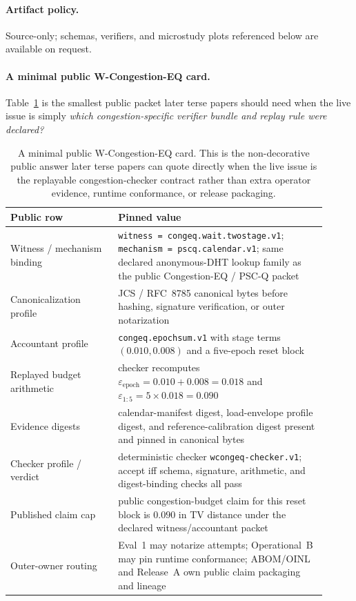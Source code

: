 \documentclass[11pt]{article}
\newcommand{\eps}{\varepsilon}
\begin{document}
\paragraph{Artifact policy.}
Source-only; schemas, verifiers, and microstudy plots referenced below are available on request.\cite{series:artifactpolicy}

\paragraph{A minimal public W-Congestion-EQ card.}
Table~\ref{tab:minimal-wcongeq-card} is the smallest public packet later terse papers should need when the live issue is simply \emph{which congestion-specific verifier bundle and replay rule were declared?}

\begin{table}[t]
\centering
\small
\begin{tabular}{@{}p{0.31\linewidth}p{0.60\linewidth}@{}}
\toprule
\textbf{Public row} & \textbf{Pinned value}\\
\midrule
Witness / mechanism binding & \texttt{witness = congeq.wait.twostage.v1}; \texttt{mechanism = pscq.calendar.v1}; same declared anonymous-DHT lookup family as the public Congestion-EQ / PSC-Q packet\\
Canonicalization profile & JCS / RFC~8785 canonical bytes before hashing, signature verification, or outer notarization\\
Accountant profile & \texttt{congeq.epochsum.v1} with stage terms $(0.010,0.008)$ and a five-epoch reset block\\
Replayed budget arithmetic & checker recomputes $\eps_{\mathrm{epoch}}=0.010+0.008=0.018$ and $\eps_{1:5}=5\times 0.018=0.090$\\
Evidence digests & calendar-manifest digest, load-envelope profile digest, and reference-calibration digest present and pinned in canonical bytes\\
Checker profile / verdict & deterministic checker \texttt{wcongeq-checker.v1}; accept iff schema, signature, arithmetic, and digest-binding checks all pass\\
Published claim cap & public congestion-budget claim for this reset block is $0.090$ in TV distance under the declared witness/accountant packet\\
Outer-owner routing & Eval~1 may notarize attempts; Operational~B may pin runtime conformance; ABOM/OINL and Release~A own public claim packaging and lineage\\
\bottomrule
\end{tabular}
\caption{A minimal public W-Congestion-EQ card. This is the non-decorative public answer later terse papers can quote directly when the live issue is the replayable congestion-checker contract rather than extra operator evidence, runtime conformance, or release packaging.}
\label{tab:minimal-wcongeq-card}
\end{table}
\end{document}
